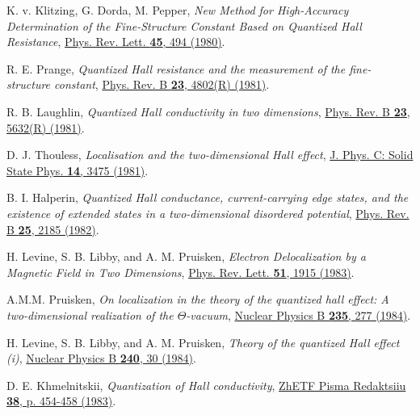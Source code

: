 \documentclass[aps,prb,amsmath,amssymb,twocolumn, superscriptaddress]{revtex4-2}
\begin{document}
\begin{thebibliography}{10}
K. v. Klitzing, G. Dorda, M. Pepper, {\em New Method for High-Accuracy Determination of the Fine-Structure Constant Based on Quantized Hall Resistance}, 
\href{https://journals.aps.org/prl/abstract/10.1103/PhysRevLett.45.494}{Phys. Rev. Lett. {\bfseries{45}}, 494 (1980)}.

R. E. Prange, {\em Quantized Hall resistance and the measurement of the fine-structure constant}, \href{https://journals.aps.org/prb/abstract/10.1103/PhysRevB.23.4802}{Phys. Rev. B {\bfseries 23}, 4802(R) (1981)}.

R. B. Laughlin, {\em Quantized Hall conductivity in two dimensions}, \href{https://journals.aps.org/prb/abstract/10.1103/PhysRevB.23.5632}{Phys. Rev. B {\bfseries 23}, 5632(R) (1981)}.

D. J. Thouless, {\em Localisation and the two-dimensional Hall effect}, \href{https://iopscience.iop.org/article/10.1088/0022-3719/14/23/022}{ J. Phys. C: Solid State Phys. {\bfseries 14}, 3475 (1981)}.

B. I. Halperin, {\em Quantized Hall conductance, current-carrying edge states, and the existence of extended states in a two-dimensional disordered potential}, \href{https://journals.aps.org/prb/abstract/10.1103/PhysRevB.25.2185}{Phys. Rev. B {\bfseries 25}, 2185 (1982)}.

H. Levine, S. B. Libby, and A. M. Pruisken, {\em Electron Delocalization by a Magnetic Field in Two Dimensions}, \href{https://journals.aps.org/prl/abstract/10.1103/PhysRevLett.51.1915}{Phys. Rev. Lett. {\bfseries 51}, 1915 (1983)}.

A.M.M. Pruisken, {\em On localization in the theory of the quantized hall effect: A two-dimensional realization of the $\Theta$-vacuum}, \href{https://www.sciencedirect.com/science/article/pii/0550321384901019}{Nuclear Physics B {\bfseries 235}, 277 (1984)}.

H. Levine, S. B. Libby, and A. M. Pruisken, {\em Theory of
the quantized Hall effect (i)}, \href{https://www.sciencedirect.com/science/article/pii/0550321384902773}{Nuclear Physics B {\bfseries 240}, 30 (1984)}.

D. E. Khmelnitskii, {\em  Quantization of Hall conductivity}, \href{https://ui.adsabs.harvard.edu/abs/1983ZhPmR..38..454K/abstract}{ZhETF Pisma Redaktsiiu {\bfseries 38}, p. 454-458 (1983)}.


\end{thebibliography}
\end{document}
